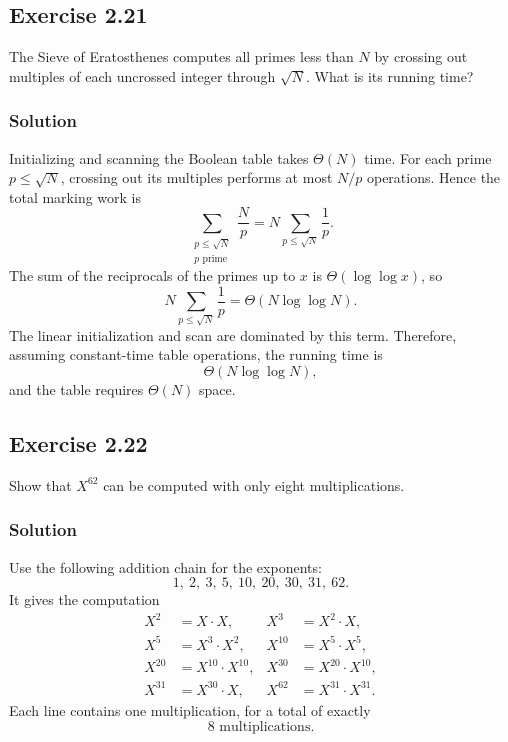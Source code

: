 \documentclass[12pt,a4paper]{article}
\begin{document}
\subsection*{\color{sectionnavy}Exercise 2.21}

\noindent
The Sieve of Eratosthenes computes all primes less than $N$ by crossing
out multiples of each uncrossed integer through $\sqrt N$. What is its
running time?

\subsubsection*{\color{sectionnavy}Solution}

Initializing and scanning the Boolean table takes $\Theta(N)$ time. For
each prime $p\leq\sqrt N$, crossing out its multiples performs at most
$N/p$ operations. Hence the total marking work is
\[
\sum_{\substack{p\leq\sqrt N\\p\text{ prime}}}\frac{N}{p}
=N\sum_{p\leq\sqrt N}\frac1p.
\]
The sum of the reciprocals of the primes up to $x$ is
$\Theta(\log\log x)$, so
\[
N\sum_{p\leq\sqrt N}\frac1p
=\Theta(N\log\log N).
\]
The linear initialization and scan are dominated by this term.
Therefore, assuming constant-time table operations, the running time is
\[
\boxed{\Theta(N\log\log N)},
\]
and the table requires $\boxed{\Theta(N)}$ space.

\subsection*{\color{sectionnavy}Exercise 2.22}

\noindent
Show that $X^{62}$ can be computed with only eight multiplications.

\subsubsection*{\color{sectionnavy}Solution}

Use the following addition chain for the exponents:
\[
1,\ 2,\ 3,\ 5,\ 10,\ 20,\ 30,\ 31,\ 62.
\]
It gives the computation
\[
\begin{aligned}
X^2   &=X\cdot X,                 &
X^3   &=X^2\cdot X,\\
X^5   &=X^3\cdot X^2,             &
X^{10}&=X^5\cdot X^5,\\
X^{20}&=X^{10}\cdot X^{10},       &
X^{30}&=X^{20}\cdot X^{10},\\
X^{31}&=X^{30}\cdot X,            &
X^{62}&=X^{31}\cdot X^{31}.
\end{aligned}
\]
Each line contains one multiplication, for a total of exactly
\[
\boxed{8\text{ multiplications}}.
\]
\end{document}
